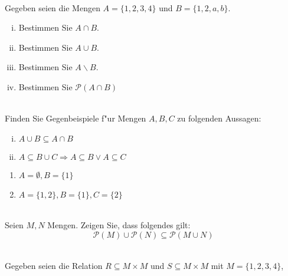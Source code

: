 \newcommand{\printpraesenzlsg}{false}
\newcommand{\printloesungen}{false}
\newcommand{\printbewertungen}{false}
\newcommand{\blattnummer}{1}




\iforiginal{}
\\
Gegeben seien die Mengen $A=\{1,2,3,4\}$ und $B=\{1,2,a,b\}$.
\begin{enumerate}[(i)]
    \item Bestimmen Sie $A\cap B$.
    \item Bestimmen Sie $A\cup B$.
    \item Bestimmen Sie $A\backslash B$.
    \item Bestimmen Sie $\mathscr{P}(A\cap B)$
    
\end{enumerate}

\\
Finden Sie Gegenbeispiele f"ur Mengen $A,B,C$ zu folgenden Aussagen:
\begin{enumerate}[(i)]
\item $A\cup B\subseteq A\cap B$
\item $A\subseteq B\cup C\Rightarrow A\subseteq B\vee A\subseteq C$
\end{enumerate}

\begin{loesung}
\begin{enumerate}
\item $A=\emptyset, B=\{1\}$
\item $A=\{1,2\},B=\{1\}, C=\{2\}$
\end{enumerate}
\end{loesung}

\\
Seien $M,N$ Mengen. Zeigen Sie, dass folgendes gilt:
\[\mathscr{P}(M)\cup\mathscr{P}(N)\subseteq \mathscr{P}(M\cup N)\]


\\
Gegeben seien die Relation $R\subseteq M\times M$ und $S\subseteq M\times M$ mit $M=\{1,2,3,4\}$, 


